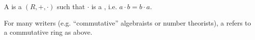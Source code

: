 \begin{definition} \label{definition:commutative_ring}
   A  is a  $(R, +, \cdot)$ such that $\cdot$ is a , i.e. $a \cdot b = b \cdot a$. 

   For many writers (e.g. ``commutative'' algebraists or number theorists), a  refers to a commutative ring as above.
\end{definition}
